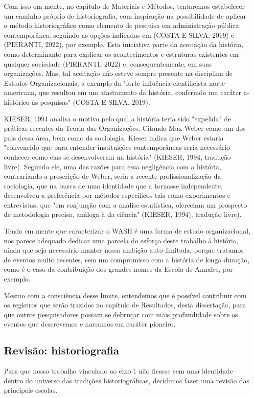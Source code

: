 Com isso em mente, no capítulo de Materiais e Métodos, tentaremos estabelecer um caminho próprio de historiografia, com inspiração na possibilidade de aplicar o método historiográfico como elemento de pesquisa em administração pública contemporânea, seguindo as opções indicadas em  (COSTA E SILVA, 2019) e (PIERANTI, 2022), por exemplo. Esta iniciativa parte da aceitação da história, como determinante para explicar os acontecimentos e estruturas existentes em qualquer sociedade (PIERANTI, 2022) e, consequentemente, em suas organizações. Mas, tal aceitação não esteve sempre presente na disciplina de Estudos Organizacionais, a exemplo da "forte influência cientificista norte-americana, que resultou em um afastamento da história, conferindo um caráter a-histórico às pesquisas" (COSTA E SILVA, 2019).

KIESER, 1994  analisa o motivo pelo qual a história teria sido "expelida" de práticas recentes da Teoria das Organizações. Citando Max Weber como um dos pais dessa área, bem como da sociologia, Kieser indica que Weber estaria "convencido que para entender instituições contemporâneas seria necessário conhecer como elas se desenvolveram na história"  (KIESER, 1994, tradução livre). Segundo ele, uma das razões para essa negligência com a história, contrariando a prescrição de Weber, seria a recente profissionalização da sociologia, que na busca de uma identidade que a tornasse independente, desenvolveu a preferência por métodos específicos tais como experimentos e entrevistas, que "em conjunção com a análise estatística, ofereciam um prospecto de metodologia precisa, análoga à da ciência" (KIESER, 1994), tradução livre).

Tendo em mente que caracterizar o WASH é uma forma de estudo organizacional, nos parece adequado dedicar uma parcela do esforço deste trabalho à história, ainda que seja necessário manter nossa ambição auto-limitada, porque tratamos de eventos muito recentes, sem um compromisso com a história de longa duração, como é o caso da contribuição dos grandes nomes da Escola de Annales, por exemplo.

Mesmo com a consciência desse limite, entendemos que é possível contribuir com os registros que serão trazidos no capítulo de Resultados, desta dissertação, para que outros pesquisadores possam se debruçar com mais profundidade sobre os eventos que descrevemos e narramos em caráter pioneiro.

\subsection[Revisão: historiografia]{Revisão: historiografia}\label{Revisão: historiografia}
Para que nosso trabalho vinculado ao eixo 1 não ficasse sem uma identidade dentro do universo das tradições historiográficas, decidimos fazer uma revisão das principais escolas.

